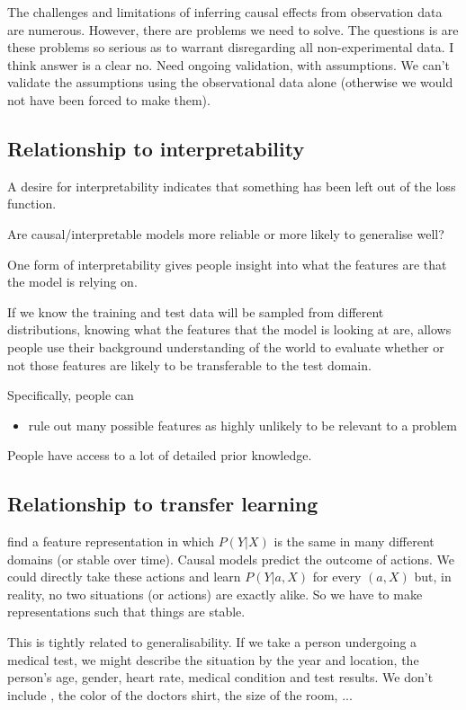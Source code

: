 The challenges and limitations of inferring causal effects from observation data are numerous. However, there are problems we need to solve. The questions is are these problems so serious as to warrant disregarding all non-experimental data. I think answer is a clear no. Need ongoing validation, with assumptions. We can't validate the assumptions using the observational data alone (otherwise we would not have been forced to make them).


\subsection*{Relationship to interpretability}

A desire for interpretability indicates that something has been left out of the loss function. 

Are causal/interpretable models more reliable or more likely to generalise well? 

One form of interpretability gives people insight into what the features are that the model is relying on. 

If we know the training and test data will be sampled from different distributions, knowing what the features that the model is looking at are, allows people use their background understanding of the world to evaluate whether or not those features are likely to be transferable to the test domain. 

Specifically, people can
\begin{itemize}
\item rule out many possible features as highly unlikely to be relevant to a problem
\end{itemize}

People have access to a lot of detailed prior knowledge. 

\subsection*{Relationship to transfer learning}

find a feature representation in which $P(Y|X)$ is the same in many different domains (or stable over time). Causal models predict the outcome of actions. We could directly take these actions and learn $P(Y|a,X)$ for every $(a,X)$ but, in reality, no two situations (or actions) are exactly alike. So we have to make representations such that things are stable. 

This is tightly related to generalisability. If we take a person undergoing a medical test, we might describe the situation by the year and location, the person's age, gender, heart rate, medical condition and test results. We don't include , the color of the doctors shirt, the size of the room, ...

